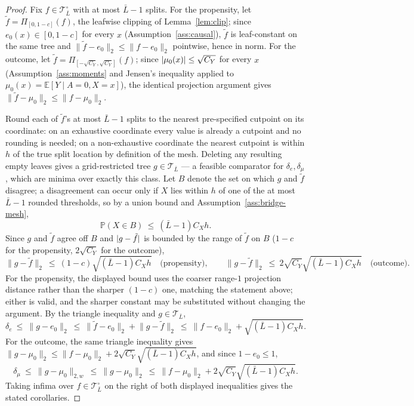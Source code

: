 \documentclass[11pt]{article}
\theoremstyle{plain}
\theoremstyle{definition}
\theoremstyle{remark}
\newcommand{\E}{\mathbb{E}}
\newcommand{\PP}{\mathbb{P}}
\newcommand{\cT}{\mathcal{T}}
\newcommand{\ez}{e_0}
\newcommand{\mz}{\mu_0}
\newcommand{\Ltwo}[1]{\lVert #1 \rVert_{2}}
\newcommand{\Lw}[1]{\lVert #1 \rVert_{2,w}}
\DeclarePairedDelimiter{\abs}{\lvert}{\rvert}
\begin{document}
\begin{proof}
Fix $f\in\cT_{\bar L}^\circ$ with at most $\bar L-1$ splits. For the
propensity, let $\tilde f=\Pi_{[0,1-c]}(f)$, the leafwise clipping of
Lemma~\ref{lem:clip}; since $\ez(x)\in[0,1-c]$ for every $x$
(Assumption~\ref{ass:causal}), $\tilde f$ is leaf-constant on the same tree
and $\Ltwo{\tilde f-\ez}\le\Ltwo{f-\ez}$ pointwise, hence in norm. For the
outcome, let $\tilde f=\Pi_{[-\sqrt{C_Y},\sqrt{C_Y}]}(f)$; since
$\abs{\mz(x)}\le\sqrt{C_Y}$ for every $x$ (Assumption~\ref{ass:moments} and
Jensen's inequality applied to $\mz(x)=\E[Y\mid A=0,X=x]$), the identical
projection argument gives $\Ltwo{\tilde f-\mz}\le\Ltwo{f-\mz}$.

Round each of $\tilde f$'s at most $\bar L-1$ splits to the nearest
pre-specified cutpoint on its coordinate: on an exhaustive coordinate every
value is already a cutpoint and no rounding is needed; on a non-exhaustive
coordinate the nearest cutpoint is within $h$ of the true split location by
definition of the mesh. Deleting any resulting empty leaves gives a
grid-restricted tree $g\in\cT_{\bar L}$ --- a feasible comparator for
$\delta_e,\delta_\mu$, which are minima over exactly this class. Let $B$
denote the set on which $g$ and $\tilde f$ disagree; a disagreement can occur
only if $X$ lies within $h$ of one of the at most $\bar L-1$ rounded
thresholds, so by a union bound and Assumption~\ref{ass:bridge-mesh},
\[
  \PP(X\in B)\ \le\ (\bar L-1)C_Xh .
\]
Since $g$ and $\tilde f$ agree off $B$ and $\abs{g-\tilde f}$ is bounded by
the range of $\tilde f$ on $B$ ($1-c$ for the propensity, $2\sqrt{C_Y}$ for
the outcome),
\[
  \Ltwo{g-\tilde f}\ \le\ (1-c)\sqrt{(\bar L-1)C_Xh}
  \quad\text{(propensity)},
  \qquad
  \Ltwo{g-\tilde f}\ \le\ 2\sqrt{C_Y}\sqrt{(\bar L-1)C_Xh}
  \quad\text{(outcome)}.
\]
For the propensity, the displayed bound uses the coarser range-$1$
projection distance rather than the sharper $(1-c)$ one, matching the
statement above; either is valid, and the sharper constant may be
substituted without changing the argument. By the triangle inequality and
$g\in\cT_{\bar L}$,
\[
  \delta_e\ \le\ \Ltwo{g-\ez}
  \ \le\ \Ltwo{\tilde f-\ez}+\Ltwo{g-\tilde f}
  \ \le\ \Ltwo{f-\ez}+\sqrt{(\bar L-1)C_Xh} .
\]
For the outcome, the same triangle inequality gives
$\Ltwo{g-\mz}\le\Ltwo{f-\mz}+2\sqrt{C_Y}\sqrt{(\bar L-1)C_Xh}$, and since
$1-\ez\le1$,
\[
  \delta_\mu\ \le\ \Lw{g-\mz}\ \le\ \Ltwo{g-\mz}
  \ \le\ \Ltwo{f-\mz}+2\sqrt{C_Y}\sqrt{(\bar L-1)C_Xh} .
\]
Taking infima over $f\in\cT_{\bar L}^\circ$ on the right of both displayed
inequalities gives the stated corollaries.
\end{proof}
\end{document}
